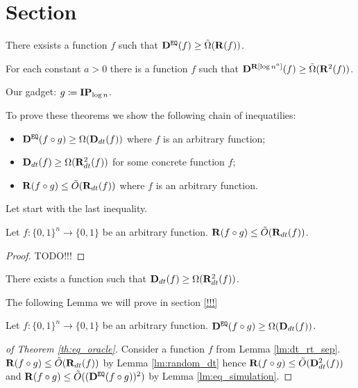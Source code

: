 \section{Section}

\begin{theorem}
    \label{th:eq_oracle}
    There exsists a function $f$ such that $\mathbf{D}^{\mathtt{EQ}}(f) \ge \tilde{\Omega}(\mathbf{R}(f))$.
\end{theorem}

\begin{theorem}
    For each constant $a > 0$ there is a function $f$ such that $\mathbf{D}^{\mathbf{R}[\log n^a]}(f) \ge
    \tilde{\Omega}(\mathbf{R}^2(f))$.
\end{theorem}

Our gadget: $g \coloneqq \mathbf{IP}_{\log n}$.

To prove these theorems we show the following chain of inequatilies:
\begin{itemize}
    \item $\mathbf{D}^{\mathtt{EQ}}(f \circ g) \ge \Omega(\mathbf{D}_{dt}(f))$ where $f$ is an arbitrary function;
    \item $\mathbf{D}_{dt}(f) \ge \Omega(\mathbf{R}_{dt}^2(f))$ for some concrete function $f$;
    \item $\mathbf{R}(f \circ g) \le \tilde{O}(\mathbf{R}_{dt}(f))$ where $f$ is an arbitrary function.
\end{itemize}



Let start with the last inequality.

\begin{lemma}
    \label{lm:random_dt}
    Let $f:\{0, 1\}^n \to \{0, 1\}$ be an arbitrary function. $\mathbf{R}(f \circ g) \le \tilde{O}(\mathbf{R}_{dt}(f))$.
\end{lemma}

\begin{proof}
    TODO!!!
\end{proof}

\begin{lemma}[\ref{!!!}]
    \label{lm:dt_rt_sep}
    There exists a function such that $\mathbf{D}_{dt}(f) \ge \Omega(\mathbf{R}_{dt}^2(f))$.
\end{lemma}


The following Lemma we will prove in section \ref{!!!}

\begin{lemma}
    \label{lm:eq_simulation}
    Let $f:\{0, 1\}^n \to \{0, 1\}$ be an arbitrary function. $\mathbf{D}^{\mathtt{EQ}}(f \circ g) \ge \Omega(\mathbf{D}_{dt}(f))$.
\end{lemma}



\begin{proof}[of Theorem \ref{th:eq_oracle}]
    Consider a function $f$ from Lemma \ref{lm:dt_rt_sep}. $\mathbf{R}(f \circ g) \le \tilde{O}(\mathbf{R}_{dt}(f))$ by
    Lemma \ref{lm:random_dt} hence $\mathbf{R}(f \circ g) \le \tilde{O}(\mathbf{D}^2_{dt}(f))$ and $\mathbf{R}(f \circ g) \le
    \tilde{O}((\mathbf{D}^{\mathtt{EQ}}(f \circ g))^2)$ by Lemma \ref{lm:eq_simulation}.
\end{proof}